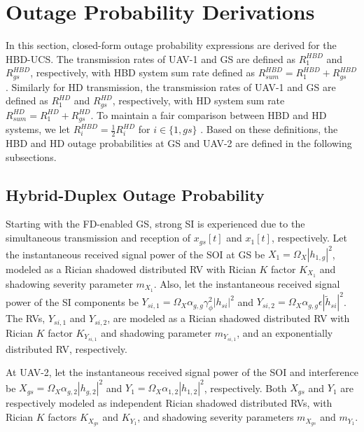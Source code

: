 \section{Outage Probability Derivations} \label{HBD_UCS_Rician_Shadowed_sec_outage}
In this section, closed-form outage probability expressions are derived for the HBD-UCS. The transmission rates of UAV-1 and GS are defined as $R^{HBD}_{1}$ and $R^{HBD}_{gs}$, respectively, with HBD system sum rate defined as $R^{HBD}_{sum} = R^{HBD}_{1}+R^{HBD}_{gs}$. Similarly for HD transmission, the transmission rates of UAV-1 and GS are defined as $R^{HD}_{1}$ and $R^{HD}_{gs}$, respectively, with HD system sum rate $R^{HD}_{sum} = R^{HD}_{1}+R^{HD}_{gs}$. To maintain a fair comparison between HBD and HD systems, we let $R_{i}^{HBD}=\frac{1}{2}R_{i}^{HD}$ for $ i \in \{1, gs\}$ \cite{sofotasios2017full}. Based on these definitions, the HBD and HD outage probabilities at GS and UAV-2 are defined in the following subsections.

\subsection{Hybrid-Duplex Outage Probability}
Starting with the FD-enabled GS, strong SI is experienced due to the simultaneous transmission and reception of $x_{gs}[t]$ and $x_1[t]$, respectively. Let the instantaneous received signal power of the SOI at GS be $X_{1}=\Omega_X|h_{1,g}|^2$, modeled as a Rician shadowed distributed RV with Rician $K$ factor $K_{X_{1}}$ and shadowing severity parameter $m_{X_{1}}$. Also, let the instantaneous received signal power of the SI components be $Y_{si,1}=\Omega_X\alpha_{g,g}\gamma_{\phi}^2|h_{si}|^2$ and $Y_{si,2}=\Omega_X\alpha_{g,g}\epsilon|\widetilde{h}_{si}|^2$. The RVs, $Y_{si,1}$ and $Y_{si,2}$, are modeled as a Rician shadowed distributed RV with Rician $K$ factor $K_{Y_{si,1}}$ and shadowing parameter $m_{Y_{si,1}}$, and an exponentially distributed RV, respectively.

At UAV-2, let the instantaneous received signal power of the SOI and interference be $X_{gs} = \Omega_{X}\alpha_{g,2}|h_{g,2}|^2$ and $Y_{1}=\Omega_{X}\alpha_{1,2}|h_{1,2}|^2$, respectively. Both $X_{gs}$ and $Y_{1}$ are respectively modeled as independent Rician shadowed distributed RVs, with Rician $K$ factors $K_{X_{gs}}$ and $K_{Y_1}$, and shadowing severity parameters $m_{X_{gs}}$ and $m_{Y_1}$.

